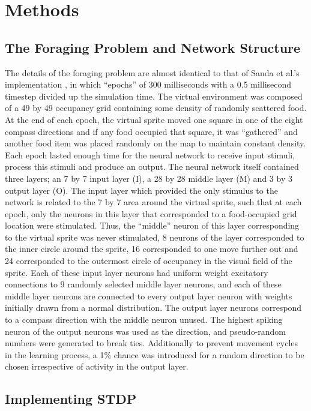 \documentclass[11pt, twocolumn]{article}
\begin{document}
\section*{Methods}
\subsection*{The Foraging Problem and Network Structure}
The details of the foraging problem are almost identical to that of Sanda et al.'s implementation \cite{sanda2017multi}, in which ``epochs'' of 300 milliseconds with a 0.5 millisecond timestep divided up the simulation time. The virtual environment was composed of a 49 by 49 occupancy grid containing some density of randomly scattered food. At the end of each epoch, the virtual sprite moved one square in one of the eight compass directions and if any food occupied that square, it was ``gathered'' and another food item was placed randomly on the map to maintain constant density. Each epoch lasted enough time for the neural network to receive input stimuli, process this stimuli and produce an output. The neural network itself contained three layers; an 7 by 7 input layer (I), a 28 by 28 middle layer (M) and 3 by 3 output layer (O). The input layer which provided the only stimulus to the network is related to the 7 by 7 area around the virtual sprite, such that at each epoch, only the neurons in this layer that corresponded to a food-occupied grid location were stimulated. Thus, the ``middle'' neuron of this layer corresponding to the virtual sprite was never stimulated, 8 neurons of the layer corresponded to the inner circle around the sprite, 16 corresponded to one move further out and 24 corresponded to the outermost circle of occupancy in the visual field of the sprite. Each of these input layer neurons had uniform weight excitatory connections to 9 randomly selected middle layer neurons, and each of these middle layer neurons are connected to every output layer neuron with weights initially drawn from a normal distribution. The output layer neurons correspond to a compass direction with the middle neuron unused. The highest spiking neuron of the output neurons was used as the direction, and pseudo-random numbers were generated to break ties. Additionally to prevent movement cycles in the learning process, a 1\% chance was introduced for a random direction to be chosen irrespective of activity in the output layer.

\subsection*{Implementing \acs{STDP}}
\end{document}
